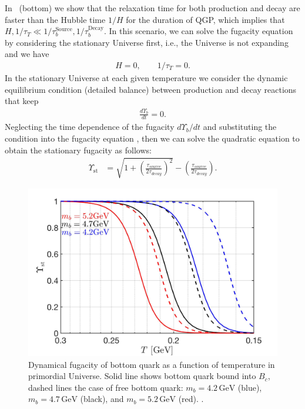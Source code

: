 In~ (bottom) we show that the relaxation time for both production and decay are faster than the Hubble time $1/H$ for the duration of QGP, which implies that $H,1/\tau_T\ll1/\tau_{b}^{\mathrm{Source}},1/\tau^{\mathrm{Decay}}_b$. In this scenario, we can solve the fugacity equation by considering the stationary Universe first, i.e., the Universe is not expanding and we have
\begin{align}\label{stationary}
H=0,\qquad 1/\tau_T=0.
\end{align} 
In the stationary Universe at each given temperature we consider the dynamic equilibrium condition (detailed balance) between production and decay reactions that keep
\begin{align}
\frac{d\Upsilon_b}{dt}=0.
\end{align}
Neglecting the time dependence of the fugacity $d\Upsilon_b/dt$ and substituting the condition  into the fugacity equation , then we can solve the quadratic equation to obtain the stationary fugacity as follows: %
\begin{align}
\label{Fugacity_Sol}
\Upsilon_{\mathrm{st}}&=\sqrt{1+\left(\frac{\tau_{source}}{2\tau_{decay}}\right)^2}-\left(\frac{\tau_{source}}{2\tau_{decay}}\right).
\end{align} 

\begin{figure} 
\centerline{\includegraphics[width=0.9\linewidth]{./plots/BquarkFugacity_tot}}
\caption{Dynamical fugacity of bottom quark as a function of temperature in primordial Universe. Solid line shows bottom quark bound into $B_c$, dashed lines the case of free bottom quark: $m_b=4.2\,\mathrm{GeV}$ (blue), $m_b=4.7\,\mathrm{GeV}$ (black), and $m_b=5.2\,\mathrm{GeV}$ (red). . }
\label{fugacity_bc}
\end{figure}

